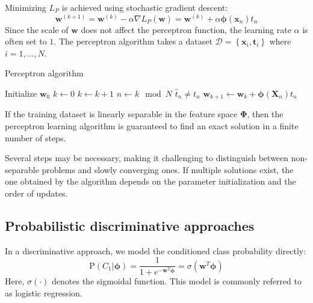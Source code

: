 Minimizing $L_P$ is achieved using stochastic gradient descent:
\[\textbf{w}^{(k+1)}=\textbf{w}^{(k)}-\alpha\nabla L_P(\textbf{w})=\textbf{w}^{(k)}+\alpha\boldsymbol{\phi}(\textbf{x}_n)t_n\]
Since the scale of $\textbf{w}$ does not affect the perceptron function, the learning rate $\alpha$ is often set to $1$. 
The perceptron algorithm takes a dataset $\mathcal{D}=\left\{ \textbf{x}_i,\textbf{t}_i  \right\}$ where $i=1,\dots,N$. 
\begin{algorithm}[H]
    \caption{Perceptron algorithm}
        \begin{algorithmic}[1]
            \State{} Initialize $\textbf{w}_0$
            \State{} $k \leftarrow 0$
            \Repeat{}
                \State{} $k \leftarrow k+1$
                \State{} $n \leftarrow k \mod N$
                \If{} {$\hat{t}_n \neq t_n$}
                    \State{} $\textbf{w}_{k+1} \leftarrow \textbf{w}_k + \boldsymbol{\phi}(\textbf{X}_n)t_n$
                \EndIf{}
        \end{algorithmic}
\end{algorithm}
\begin{theorem}
    If the training dataset is linearly separable in the feature space $\boldsymbol{\Phi}$, then the perceptron learning algorithm is guaranteed to find an exact solution in a finite number of steps.
\end{theorem}
Several steps may be necessary, making it challenging to distinguish between non-separable problems and slowly converging ones. 
If multiple solutions exist, the one obtained by the algorithm depends on the parameter initialization and the order of updates.

\subsection{Probabilistic discriminative approaches}
In a discriminative approach, we model the conditioned class probability directly:
\[\text{P}(C_1|\boldsymbol{\phi})=\dfrac{1}{1+e^{-\textbf{w}^T\boldsymbol{\phi}}}=\sigma(\textbf{w}^T\boldsymbol{\phi})\]
Here, $\sigma(\cdot)$ denotes the sigmoidal function. 
This model is commonly referred to as logistic regression.


